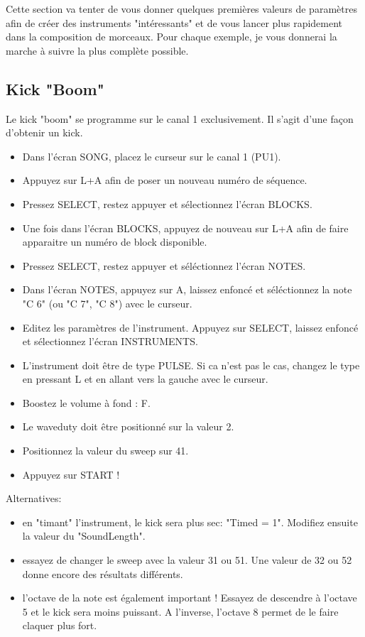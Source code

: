 Cette section va tenter de vous donner quelques premières valeurs de paramètres afin de créer des instruments "intéressants"
et de vous lancer plus rapidement dans la composition de morceaux.
Pour chaque exemple, je vous donnerai la marche à suivre la plus complète possible.

\subsection{Kick "Boom"}

Le kick "boom" se programme sur le canal 1 exclusivement. Il s'agit d'une façon d'obtenir un kick.
\medskip

\begin{itemize}
\item{Dans l'écran SONG, placez le curseur sur le canal 1 (PU1).}
\item{Appuyez sur L+A afin de poser un nouveau numéro de séquence.}
\item{Pressez SELECT, restez appuyer et sélectionnez l'écran BLOCKS.}
\item{Une fois dans l'écran BLOCKS, appuyez de nouveau sur L+A afin de faire apparaitre un numéro de block disponible.}
\item{Pressez SELECT, restez appuyer et séléctionnez l'écran NOTES.}
\item{Dans l'écran NOTES, appuyez sur A, laissez enfoncé et séléctionnez la note "C 6" (ou "C 7", "C 8") avec le curseur.}
\item{Editez les paramètres de l'instrument. Appuyez sur SELECT, laissez enfoncé et sélectionnez l'écran INSTRUMENTS.}
\item{L'instrument doit être de type PULSE. Si ca n'est pas le cas, changez le type en pressant L et en allant vers la gauche avec le curseur.}
\item{Boostez le volume à fond : F.}
\item{Le waveduty doit être positionné sur la valeur 2.}
\item{Positionnez la valeur du sweep sur 41.}
\item{Appuyez sur START !}
\end{itemize}\medskip

Alternatives:
\medskip

\begin{itemize}
\item{en "timant" l'instrument, le kick sera plus sec: "Timed = 1". Modifiez ensuite la valeur du "SoundLength".}
\item{essayez de changer le sweep avec la valeur 31 ou 51. Une valeur de 32 ou 52 donne encore des résultats différents.}
\item{l'octave de la note est également important ! Essayez de descendre à l'octave 5 et le kick sera moins puissant. A l'inverse, l'octave 8 permet de le faire claquer plus fort.}
\end{itemize}\medskip

